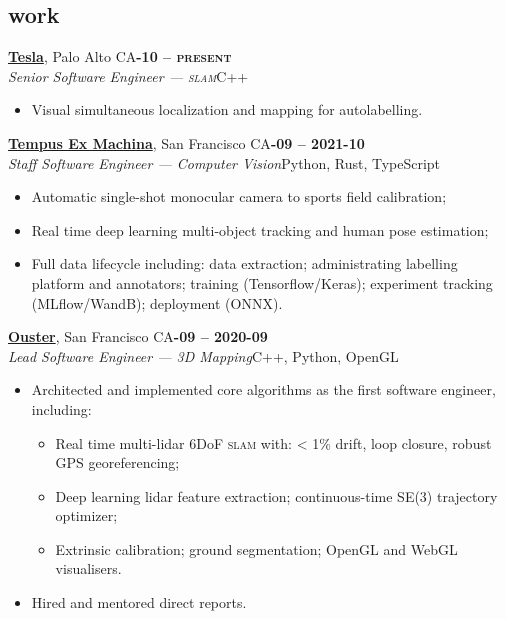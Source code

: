 \documentclass[margin,10pt]{res}
\begin{document}
\begin{resume}
\section{\sc \lsstyle work}
    \href{https://tesla.com}{\textbf{Tesla}}, Palo Alto CA\hfill \textsc{\bfseries{}-10 -- present}\\
    \textit{Senior Software Engineer --- \textsc{slam}}\hfill C++
    \vspace{0.5em}
    \begin{itemize}
        \item Visual simultaneous localization and mapping for autolabelling.
    \end{itemize}

    \href{https://tempus-ex.com}{\textbf{Tempus Ex Machina}}, San Francisco CA\hfill \textsc{\bfseries{}-09 -- 2021-10}\\
    \textit{Staff Software Engineer --- Computer Vision}\hfill Python, Rust, TypeScript
    \vspace{0.5em}
    \begin{itemize}
        \item Automatic single-shot monocular camera to sports field calibration;
        \item Real time deep learning multi-object tracking and human pose estimation;
        \item Full data lifecycle including: data extraction; administrating labelling platform and annotators; training (Tensorflow/Keras); experiment tracking (MLflow/WandB); deployment (ONNX).
    \end{itemize}

    \href{https://ouster.io}{\textbf{Ouster}}, San Francisco CA\hfill \textsc{\bfseries{}-09 -- 2020-09}\\
    \textit{Lead Software Engineer --- 3D Mapping}\hfill C++, Python, OpenGL
    \vspace{0.5em}
    \begin{itemize}
        \item Architected and implemented core algorithms as the first software engineer, including:
        \begin{itemize}
            \item Real time multi-lidar 6DoF \textsc{slam} with: < 1\% drift, loop closure, robust GPS georeferencing;
            \item Deep learning lidar feature extraction; continuous-time SE(3) trajectory optimizer;
            \item Extrinsic calibration; ground segmentation; OpenGL and WebGL visualisers.
        \end{itemize}
        \item Hired and mentored direct reports.
    \end{itemize}

\end{resume}
\end{document}
